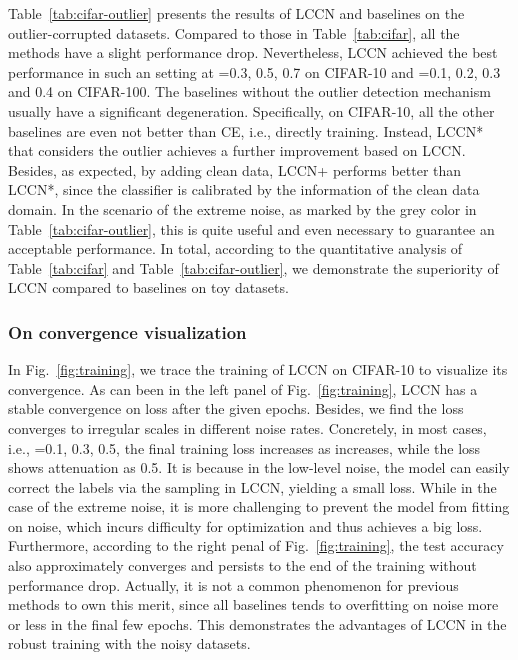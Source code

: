 \documentclass[journal]{IEEEtran}
\begin{document}
Table~\ref{tab:cifar-outlier} presents the results of LCCN and baselines on the outlier-corrupted datasets. Compared to those in Table~\ref{tab:cifar}, all the methods have a slight performance drop. Nevertheless, LCCN achieved the best performance in such an setting at =0.3, 0.5, 0.7 on CIFAR-10 and =0.1, 0.2, 0.3 and 0.4 on CIFAR-100. The baselines without the outlier detection mechanism usually have a significant degeneration. Specifically, on CIFAR-10, all the other baselines are even not better than CE, i.e., directly training. Instead, LCCN* that considers the outlier achieves a further improvement based on LCCN. Besides, as expected, by adding clean data, LCCN+ performs better than LCCN*, since the classifier is calibrated by the information of the clean data domain.
In the scenario of the extreme noise, as marked by the grey color in Table~\ref{tab:cifar-outlier}, this is quite useful and even necessary to guarantee an acceptable performance. In total, according to the quantitative analysis of Table~\ref{tab:cifar} and Table~\ref{tab:cifar-outlier}, we demonstrate the superiority of LCCN compared to baselines on toy datasets.

\subsubsection{On convergence visualization}
In Fig.~\ref{fig:training}, we trace the training of LCCN on CIFAR-10 to visualize its convergence. As can been in the left panel of Fig.~\ref{fig:training}, LCCN has a stable convergence on loss after the given epochs. Besides, we find the loss converges to irregular scales in different noise rates. Concretely, in most cases, i.e., =0.1, 0.3, 0.5, the final training loss increases as  increases, while the loss shows attenuation as 0.5. It is because in the low-level noise, the model can easily correct the labels via the sampling in LCCN, yielding a small loss. While in the case of the extreme noise, it is more challenging to prevent the model from fitting on noise, which incurs difficulty for optimization and thus achieves a big loss. Furthermore, according to the right penal of Fig.~\ref{fig:training}, the test accuracy also approximately converges and persists to the end of the training without performance drop. Actually, it is not a common phenomenon for previous methods to own this merit, since all baselines tends to overfitting on noise more or less in the final few epochs. This demonstrates the advantages of LCCN in the robust training with the noisy datasets.
\end{document}
